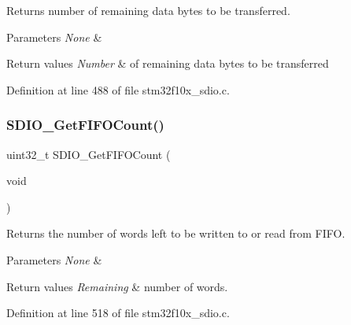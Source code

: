 Returns number of remaining data bytes to be transferred. 


\begin{DoxyParams}{Parameters}
{\em None} & \\
\hline
\end{DoxyParams}

\begin{DoxyRetVals}{Return values}
{\em Number} & of remaining data bytes to be transferred \\
\hline
\end{DoxyRetVals}


Definition at line 488 of file stm32f10x\+\_\+sdio.\+c.

\mbox{\label{group___s_d_i_o___private___functions_ga9a3343983a2d68b5164a1c89797d2dd6}} 
\subsubsection{\texorpdfstring{S\+D\+I\+O\+\_\+\+Get\+F\+I\+F\+O\+Count()}{SDIO\_GetFIFOCount()}}
{\footnotesize\ttfamily uint32\+\_\+t S\+D\+I\+O\+\_\+\+Get\+F\+I\+F\+O\+Count (\begin{DoxyParamCaption}\item[{void}]{ }\end{DoxyParamCaption})}



Returns the number of words left to be written to or read from F\+I\+FO. 


\begin{DoxyParams}{Parameters}
{\em None} & \\
\hline
\end{DoxyParams}

\begin{DoxyRetVals}{Return values}
{\em Remaining} & number of words. \\
\hline
\end{DoxyRetVals}


Definition at line 518 of file stm32f10x\+\_\+sdio.\+c.

\mbox{\label{group___s_d_i_o___private___functions_ga644514b4b3c95c5c4326d99cd166f6f9}} 

